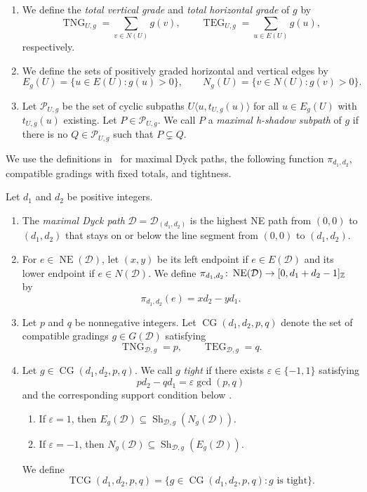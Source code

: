 \begin{definition}
\begin{enumerate}[font=\itshape]
\[\]
\item\label{d:total-grades} We define the \textit{total vertical grade} and
\textit{total horizontal grade} of $g$ by
\[
 \operatorname{TNG}_{U,g}=\sum_{v\in N(U)}g(v),\qquad
 \operatorname{TEG}_{U,g}=\sum_{u\in E(U)}g(u),
\]
respectively.
\item\label{d:positive-edge-sets} We define the sets of positively graded horizontal and vertical edges by
\[
 E_g(U)=\{u\in E(U):g(u)>0\},\qquad
 N_g(U)=\{v\in N(U):g(v)>0\}.
\]
\item Let $\mathcal P_{U,g}$ be the set of
cyclic subpaths $U\langle u,t_{U,g}(u)\rangle$ for all $u\in E_g(U)$
with $t_{U,g}(u)$ existing.
Let $P\in\mathcal P_{U,g}$.
We call $P$ a \textit{maximal h-shadow subpath} of $g$ if there is no
$Q\in\mathcal P_{U,g}$ such that $P\subsetneq Q$.
\end{enumerate}
\end{definition}

We use the definitions in~\cite{B} for maximal Dyck paths,
the following function $\pi_{d_1,d_2}$, compatible gradings
with fixed totals, and tightness.

\begin{definition}\label{def:dyck-grading}
Let $d_1$ and $d_2$ be positive integers.
\begin{enumerate}[font=\itshape]
\item The \textit{maximal Dyck path} $\mathcal{D}=\mathcal{D}_{(d_1,d_2)}$ is the highest NE path
from $(0,0)$ to $(d_1,d_2)$ that stays on or below the line segment
from $(0,0)$ to $(d_1,d_2)$.
\item\label{d:dyck-coordinate} For $e\in\operatorname{NE}(\mathcal D)$, let $(x,y)$ be its left endpoint if $e\in E(\mathcal D)$ and its lower endpoint if $e\in N(\mathcal D)$.
We define $\pi_{d_1,d_2}\colon\operatorname{NE}(\mathcal{D})\to[0,d_1+d_2-1]_{\mathbb Z}$ by
\[
 \pi_{d_1,d_2}(e)=xd_2-yd_1.
\]
\item\label{d:compatible-grading-set} Let $p$ and $q$ be nonnegative integers.
Let $\operatorname{CG}(d_1,d_2,p,q)$ denote the set of compatible gradings $g\in G(\mathcal D)$ satisfying
\[
 \operatorname{TNG}_{\mathcal{D},g}=p,\qquad
 \operatorname{TEG}_{\mathcal{D},g}=q.
\]
\item\label{d:tight-grading} Let $g\in\operatorname{CG}(d_1,d_2,p,q)$.
We call $g$ \textit{tight} if there exists $\varepsilon\in\{-1,1\}$ satisfying
\[
 pd_2-qd_1=\varepsilon\gcd(p,q)
\]
and the corresponding support condition below \cite[Definition 4.8 and Remark 4.9]{B}.
\begin{enumerate}[label=(\alph*),font=\itshape]
\item If $\varepsilon=1$, then
$E_g(\mathcal{D})\subseteq\operatorname{Sh}_{\mathcal{D},g}(N_g(\mathcal{D}))$.
\item If $\varepsilon=-1$, then
$N_g(\mathcal{D})\subseteq\operatorname{Sh}_{\mathcal{D},g}(E_g(\mathcal{D}))$.
\end{enumerate}
We define
\[
 \operatorname{TCG}(d_1,d_2,p,q)
 =\{g\in\operatorname{CG}(d_1,d_2,p,q):g\text{ is tight}\}.
\]
\end{enumerate}
\end{definition}


